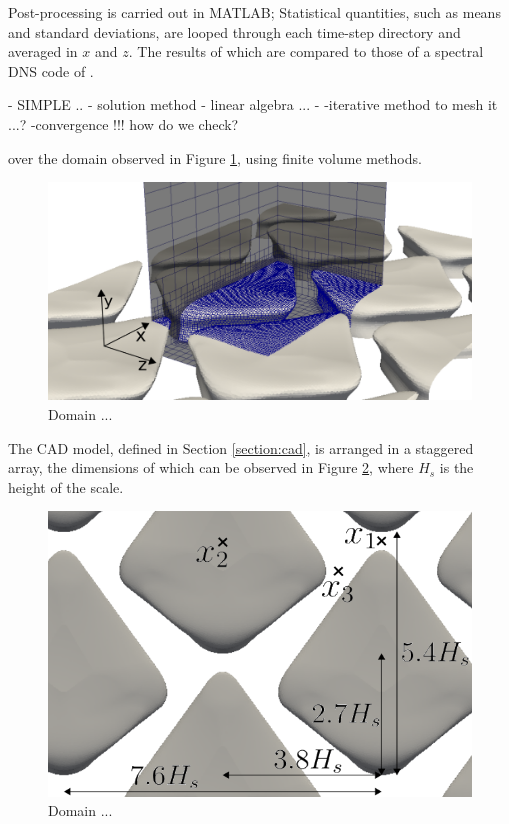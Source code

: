 \documentclass[12pt,oneside,a4paper]{article}
\begin{document}
Post-processing is carried out in MATLAB; Statistical quantities, such as means and standard deviations, are looped through each time-step directory and averaged in $x$ and $z$. The results of which are compared to those of a spectral DNS code of \cite{vreman2014}.



















	-	SIMPLE ..
	-	solution method
	-	linear algebra ...
	-	-iterative method to mesh it ...?
-convergence !!! how do we check?


over the domain observed in Figure \ref{figure:rans:methodology:periodicDomain}, using finite volume methods. 
% 
\begin{figure}[!b]
\centering
\includegraphics[width = 0.7\linewidth]{images/CFD_meshIndependence/periodicDomain.png}
\caption{Domain ...}
\label{figure:rans:methodology:periodicDomain}
\end{figure}
%
The CAD model, defined in Section \ref{section:cad}, is arranged in a staggered array, the dimensions of which can be observed in Figure \ref{figure:rans:methodology:periodicDomain3}, where $H_s$ is the height of the scale.
% 
\begin{figure}[!t]
\centering
\includegraphics[width = 0.7\linewidth]{images/CFD_meshIndependence/periodicDomain3.png}
\caption{Domain ...}
\label{figure:rans:methodology:periodicDomain3}
\end{figure}
\end{document}
